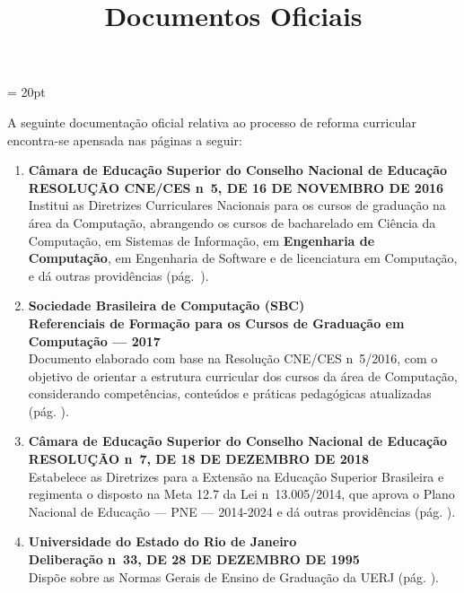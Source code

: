 \documentclass[12pt,a4paper]{article}
\title{Documentos Oficiais}
\begin{document}
\thispagestyle{firstpage} %
\headsep = 20pt
\setlength{\parindent}{0cm} %
\setlength{\tabcolsep}{5pt} %
\vspace*{2.0cm}

A seguinte documentação oficial relativa ao processo de reforma curricular encontra-se apensada nas
páginas a seguir:

\begin{enumerate}
      \item \textbf{Câmara de Educação Superior do Conselho Nacional de Educação}  \\
            \textbf{RESOLUÇÃO CNE/CES n\textordmasculine{}~5, DE 16 DE NOVEMBRO DE 2016} \\
            Institui as Diretrizes Curriculares Nacionais para os cursos de graduação na área da Computação, abrangendo os cursos de bacharelado em Ciência da Computação, em Sistemas de Informação, em \textbf{Engenharia de Computação}, em Engenharia de Software e de licenciatura em Computação, e dá outras providências (pág.~\pageref{cne2016}).

      \item \textbf{Sociedade Brasileira de Computação (SBC)}  \\
            \textbf{Referenciais de Formação para os Cursos de Graduação em Computação –-- 2017} \\
            Documento elaborado com base na Resolução CNE/CES n\textordmasculine{}~5/2016, com o objetivo de orientar a estrutura curricular dos cursos da área de Computação, considerando competências, conteúdos e práticas pedagógicas atualizadas (pág. \pageref{sbc2017}).

      \item \textbf{Câmara de Educação Superior do Conselho Nacional de Educação} \\
            \textbf{RESOLUÇÃO n\textordmasculine{}~7, DE 18 DE DEZEMBRO DE 2018} \\
            Estabelece as Diretrizes para a Extensão na Educação Superior Brasileira e regimenta o disposto na Meta 12.7 da Lei n\textordmasculine{}~13.005/2014, que aprova o Plano Nacional de Educação –-- PNE –-- 2014-2024 e dá outras providências (pág. \pageref{rcne2018}).

      \item \textbf{Universidade do Estado do Rio de Janeiro}  \\
            \textbf{Deliberação n\textordmasculine{}~33, DE 28 DE DEZEMBRO DE 1995} \\
            Dispõe sobre as Normas Gerais de Ensino de Graduação da UERJ (pág. \pageref{delib3395}).


\end{enumerate}
\end{document}
